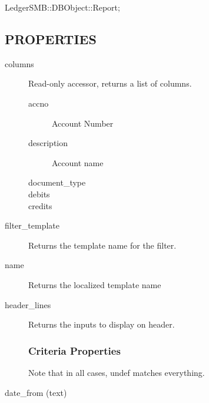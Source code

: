 \begin{description}
\begin{description}
\begin{description}
\begin{description}
\item[{LedgerSMB::DBObject::Report;}] \mbox{}\end{description}
\subsection*{PROPERTIES\label{LedgerSMB::DBObject::Report::co::Caja_Diaria_PROPERTIES}}
\begin{description}

\item[{columns}] \mbox{}

Read-only accessor, returns a list of columns.

\begin{description}

\item[{accno}] \mbox{}

Account Number


\item[{description}] \mbox{}

Account name


\item[{document\_type}] \mbox{}
\item[{debits}] \mbox{}
\item[{credits}] \mbox{}\end{description}

\item[{filter\_template}] \mbox{}

Returns the template name for the filter.


\item[{name}] \mbox{}

Returns the localized template name


\item[{header\_lines}] \mbox{}

Returns the inputs to display on header.

\subsubsection*{Criteria Properties\label{LedgerSMB::DBObject::Report::co::Caja_Diaria_Criteria_Properties}}


Note that in all cases, undef matches everything.


\item[{date\_from (text)}] \mbox{}


\end{description}
\end{description}
\end{description}
\end{description}
